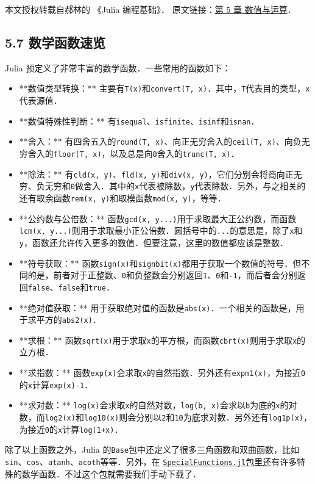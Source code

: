 
本文授权转载自郝林的 《Julia 编程基础》． 原文链接：\href{https://github.com/hyper0x/JuliaBasics/blob/master/book/ch05.md}{第 5 章 数值与运算}．


\subsection{5.7 数学函数速览}

Julia 预定义了非常丰富的数学函数．一些常用的函数如下：

\begin{itemize}
\item **数值类型转换：** 主要有\verb|T(x)|和\verb|convert(T, x)|．其中，\verb|T|代表目的类型，\verb|x|代表源值．
\item **数值特殊性判断：** 有\verb|isequal|、\verb|isfinite|、\verb|isinf|和\verb|isnan|．
\item **舍入：** 有四舍五入的\verb|round(T, x)|、向正无穷舍入的\verb|ceil(T, x)|、向负无穷舍入的\verb|floor(T, x)|，以及总是向\verb|0|舍入的\verb|trunc(T, x)|．
\item **除法：** 有\verb|cld(x, y)|、\verb|fld(x, y)|和\verb|div(x, y)|，它们分别会将商向正无穷、负无穷和\verb|0|做舍入．其中的\verb|x|代表被除数，\verb|y|代表除数．另外，与之相关的还有取余函数\verb|rem(x, y)|和取模函数\verb|mod(x, y)|，等等．
\item **公约数与公倍数：** 函数\verb|gcd(x, y...)|用于求取最大正公约数，而函数\verb|lcm(x, y...)|则用于求取最小正公倍数．圆括号中的\verb|...|的意思是，除了\verb|x|和\verb|y|，函数还允许传入更多的数值．但要注意，这里的数值都应该是整数．
\item **符号获取：** 函数\verb|sign(x)|和\verb|signbit(x)|都用于获取一个数值的符号．但不同的是，前者对于正整数、\verb|0|和负整数会分别返回\verb|1|、\verb|0|和\verb|-1|，而后者会分别返回\verb|false|、\verb|false|和\verb|true|．
\item **绝对值获取：** 用于获取绝对值的函数是\verb|abs(x)|．一个相关的函数是，用于求平方的\verb|abs2(x)|．
\item **求根：** 函数\verb|sqrt(x)|用于求取\verb|x|的平方根，而函数\verb|cbrt(x)|则用于求取\verb|x|的立方根．
\item **求指数：** 函数\verb|exp(x)|会求取\verb|x|的自然指数．另外还有\verb|expm1(x)|，为接近\verb|0|的\verb|x|计算\verb|exp(x)-1|．
\item **求对数：** \verb|log(x)|会求取\verb|x|的自然对数，\verb|log(b, x)|会求以\verb|b|为底的\verb|x|的对数，而\verb|log2(x)|和\verb|log10(x)|则会分别以\verb|2|和\verb|10|为底求对数．另外还有\verb|log1p(x)|，为接近\verb|0|的\verb|x|计算\verb|log(1+x)|．
\end{itemize}

除了以上函数之外，Julia 的\verb|Base|包中还定义了很多三角函数和双曲函数，比如\verb|sin|、\verb|cos|、\verb|atanh|、\verb|acoth|等等．另外，在 \href{https://github.com/JuliaMath/SpecialFunctions.jl}{\verb|SpecialFunctions.jl|包}里还有许多特殊的数学函数．不过这个包就需要我们手动下载了．